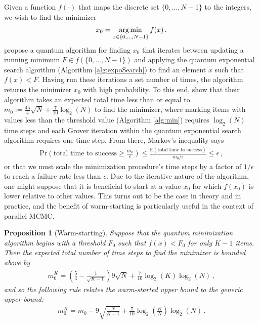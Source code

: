 \documentclass[12pt]{article} %
\newtheorem{prop}{Proposition}
\newcommand{\argmin}{\operatornamewithlimits{arg\,min}}
\begin{document}
Given a function $f(\cdot)$ that maps the discrete set $\{0,\dots,N-1\}$ to the integers, we wish to find the minimizer
\begin{align*}
x_0 = \argmin_{x\in\{0,\dots,N-1\}} f(x) \, .
\end{align*}
 \citet{durr1996quantum} propose a quantum algorithm for finding $x_0$ that iterates between updating a running minimum $F\in f(\{0,\dots,N-1\})$ and applying the quantum exponential search algorithm (Algorithm \ref{alg:expoSearch}) to find an element $x$ such that $f(x)<F$.  Having run these iterations a set number of times, the algorithm returns the minimizer $x_0$ with high probability. 
 To this end, \citet{durr1996quantum} show that their algorithm takes an expected total time less than or equal to $m_0:=\frac{45}{4}\sqrt{N}+\frac{7}{10}\log_2(N)$ to find the minimizer, where marking items with values less than the threshold value (Algorithm \ref{alg:min}) requires $\log_2(N)$ time steps and each Grover iteration within the quantum exponential search algorithm requires one time step. From there, Markov's inequality says
 \begin{align*}
 \mbox{Pr}\left( \mbox{total time to success} \geq \frac{m_0}{\epsilon}\right) \leq \frac{\mbox{E}\left(\mbox{total time to success}\right)}{m_0/\epsilon}\leq \epsilon \, ,
 \end{align*}
 or that we must scale the minimization procedure's time steps by a factor of $1/\epsilon$ to reach a failure rate less than $\epsilon$.  Due to the iterative nature of the algorithm, one might suppose that it is beneficial to start at a value $x_0$ for which $f(x_0)$ is lower relative to other values. This turns out to be the case in theory and in practice, and the benefit of warm-starting is particularly useful in the context of parallel MCMC.



\begin{prop}[Warm-starting]\label{prop:warm}
	Suppose that the quantum minimization algorithm begins with a threshold $F_0$ such that $f(x)<F_0$ for only $K-1$ items. Then the expected total number of time steps to find the minimizer is bounded above by
	\begin{align*}
	m_0^K = \left(\frac{5}{4} - \frac{1}{\sqrt{K-1}} \right) 9\sqrt{N} + \frac{7}{10} \log_2(K) \log_2(N) \, ,
	\end{align*}
	and so the following rule relates the warm-started upper bound to the generic upper bound:
	\begin{align*}
	m_0^K = m_0 - 9\sqrt{\frac{N}{K-1}} + \frac{7}{10} \log_2 \left(\frac{K}{N} \right) \log_2(N)\, .
	\end{align*} 
\end{prop}
\end{document}
